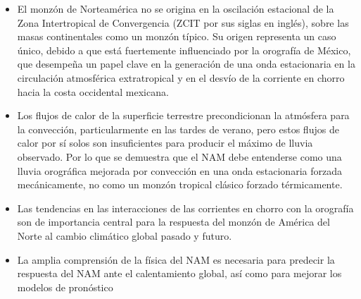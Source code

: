 \documentclass[12pt]{article}
\begin{document}
\begin{itemize}
\item El monzón de Norteamérica no se origina en la oscilación estacional de la Zona Intertropical de Convergencia (ZCIT por sus siglas en inglés), sobre las masas continentales como un monzón típico. Su origen representa un caso único, debido a que está fuertemente influenciado por la orografía de México, que desempeña un papel clave en la generación de una onda estacionaria en la circulación atmosférica extratropical y en el desvío de la corriente en chorro hacia la costa occidental mexicana.
\item  Los flujos de calor de la superficie terrestre precondicionan la atmósfera para la convección, particularmente en las tardes de verano, pero estos flujos de calor por sí solos son insuficientes para producir el máximo de lluvia observado. Por lo que se demuestra que el NAM debe entenderse como una lluvia orográfica mejorada por convección en una onda estacionaria forzada mecánicamente, no como un monzón tropical clásico forzado térmicamente.
\item  Las tendencias en las interacciones de las corrientes en chorro con la orografía son de importancia central para la respuesta del monzón de América del Norte al cambio climático global pasado y futuro.
\item  La amplia comprensión de la física del NAM es necesaria para predecir la respuesta del NAM ante el calentamiento global, así como para mejorar los modelos de pronóstico
\end{itemize}





\newpage



\end{document}
